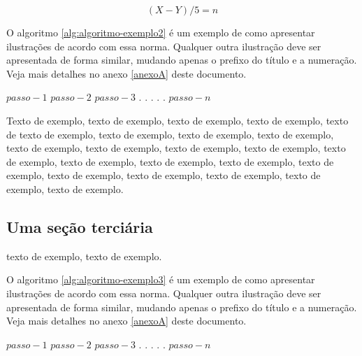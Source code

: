 \documentclass[
	12pt,				%
	oneside,			%
	a4paper,			%
	english,			%
	brazil				%
	]{abntex2ppgsi}
\begin{document}
\begin{equation}
  (X - Y)/5 = n
	\label{eq:equacao-exemplo2}
\end{equation}


O algoritmo \ref{alg:algoritmo-exemplo2} é um exemplo de como apresentar ilustrações de acordo com essa norma. Qualquer outra ilustração deve ser apresentada de forma similar, mudando apenas o prefixo do título e a numeração. Veja mais detalhes no anexo \ref{anexoA} deste documento.

\begin{algorithm}[htbp]
\caption{Exemplo de título de ilustração do tipo algoritmo}
\label{alg:algoritmo-exemplo2}
\begin{algorithmic}[1]
\State $passo-1$
\State $passo-2$
\State $passo-3$
\State $.$
\State $.$
\State $.$
\State $.$
\State $.$
\State $passo-n$
\EndProcedure
\end{algorithmic}
\end{algorithm}

Texto de exemplo, texto de exemplo, texto de exemplo, texto de exemplo, texto de texto de exemplo, texto de exemplo, texto de exemplo, texto de exemplo, texto de exemplo, texto de exemplo, texto de exemplo, texto de exemplo, texto de exemplo, texto de exemplo, texto de exemplo, texto de exemplo, texto de exemplo, texto de exemplo, texto de exemplo, texto de exemplo, texto de exemplo, texto de exemplo.

\subsection{Uma seção terciária}

 texto de exemplo, texto de exemplo.

O algoritmo \ref{alg:algoritmo-exemplo3} é um exemplo de como apresentar ilustrações de acordo com essa norma. Qualquer outra ilustração deve ser apresentada de forma similar, mudando apenas o prefixo do título e a numeração. Veja mais detalhes no anexo \ref{anexoA} deste documento.

\begin{algorithm}[htbp]
\caption{Exemplo de título de ilustração do tipo algoritmo}
\label{alg:algoritmo-exemplo3}
\begin{algorithmic}[1]
\State $passo-1$
\State $passo-2$
\State $passo-3$
\State $.$
\State $.$
\State $.$
\State $.$
\State $.$
\State $passo-n$
\EndProcedure
\end{algorithmic}
\end{algorithm}
\end{document}

